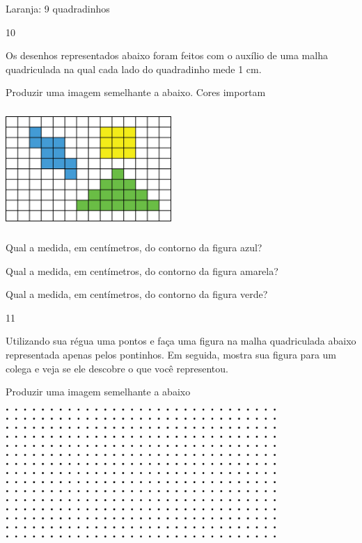 \begin{escolha}
Laranja: 9 quadradinhos

\num{10}

Os desenhos representados abaixo foram feitos com o auxílio de uma malha
quadriculada na qual cada lado do quadradinho mede 1 cm.

Produzir uma imagem semelhante a abaixo. Cores importam

\includegraphics[width=2.47521in,height=1.77515in]{media/image57.png}

\begin{escolha}

\item
  Qual a medida, em centímetros, do contorno da figura azul?
\coment{18 cm}

\item
  Qual a medida, em centímetros, do contorno da figura amarela?
\coment{12 cm}

\item
  Qual a medida, em centímetros, do contorno da figura verde?
\coment{22 cm}

\end{escolha}

\num{11}

Utilizando sua régua uma pontos e faça uma figura na malha quadriculada
abaixo representada apenas pelos pontinhos. Em seguida, mostra sua
figura para um colega e veja se ele descobre o que você representou.

Produzir uma imagem semelhante a abaixo

\includegraphics[width=4.05869in,height=1.93350in]{media/image58.png}


\end{escolha}
